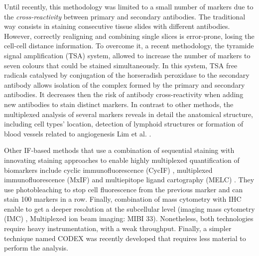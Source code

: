 Until recently, this methodology was limited to a small number of
markers due to the \emph{cross-reactivity} between primary and secondary
antibodies. The traditional way consists in staining consecutive tissue
slides with different antibodies. However, correctly realigning and
combining single slices is error-prone, losing the cell-cell distance
information. To overcome it, a recent methodology, the tyramide signal
amplification (TSA) system, allowed to increase the number of markers to
seven colours that could be stained simultaneously. In this system, TSA
free radicals catalysed by conjugation of the horseradish peroxidase to
the secondary antibody allows isolation of the complex formed by the
primary and secondary antibodies. It decreases then the risk of antibody
cross-reactivity when adding new antibodies to stain distinct markers.
In contrast to other methods, the multiplexed analysis of several
markers reveals in detail the anatomical structure, including cell
types' location, detection of lymphoid structures or formation of blood
vessels related to angiogenesis Lim et al.
\autocite{lim_etal18}.


Other IF-based methods that use a combination of sequential staining
with innovating staining approaches to enable highly multiplexed
quantification of biomarkers include cyclic immunofluorescence (CycIF)
\autocite{lin_etal15}, multiplexed immunofluorescence
(MxIF)\autocite{gerdes_etal13} and
multiepitope ligand cartography (MELC)
\autocite{schubert_etal06}. They
use photobleaching to stop cell fluorescence from the previous marker
and can stain 100 markers in a row. Finally, combination of mass
cytometry with IHC enable to get a deeper resolution at the subcellular
level (imaging mass cytometry (IMC)
\autocite{giesen_etal14}, Multiplexed
ion beam imaging: MIBI 33). Nonetheless, both technologies require heavy
instrumentation, with a weak throughput. Finally, a simpler technique named CODEX was
recently developed \autocite{goltsev_etal18} that requires less material to perform the analysis.

